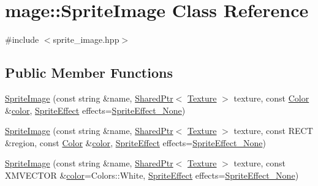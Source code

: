 \hypertarget{classmage_1_1_sprite_image}{}\section{mage\+:\+:Sprite\+Image Class Reference}
\label{classmage_1_1_sprite_image}


{\ttfamily \#include $<$sprite\+\_\+image.\+hpp$>$}

\subsection*{Public Member Functions}
\begin{DoxyCompactItemize}
\item 
\hyperlink{classmage_1_1_sprite_image_a11448d089eb7a52002faa59fe6600182}{Sprite\+Image} (const string \&name, \hyperlink{namespacemage_a1e01ae66713838a7a67d30e44c67703e}{Shared\+Ptr}$<$ \hyperlink{classmage_1_1_texture}{Texture} $>$ texture, const \hyperlink{structmage_1_1_color}{Color} \&\hyperlink{namespacemage_a56eceea5a9bceb2b56073f3ea4945781}{color}, \hyperlink{namespacemage_a9cfe18123066ba4236f548f9de75d881}{Sprite\+Effect} effects=\hyperlink{namespacemage_a9cfe18123066ba4236f548f9de75d881af3c275fbfacfe174da928b2f24dfa515}{Sprite\+Effect\+\_\+\+None})
\item 
\hyperlink{classmage_1_1_sprite_image_a868ee995b3ef1786453e8a695908e871}{Sprite\+Image} (const string \&name, \hyperlink{namespacemage_a1e01ae66713838a7a67d30e44c67703e}{Shared\+Ptr}$<$ \hyperlink{classmage_1_1_texture}{Texture} $>$ texture, const R\+E\+CT \&region, const \hyperlink{structmage_1_1_color}{Color} \&\hyperlink{namespacemage_a56eceea5a9bceb2b56073f3ea4945781}{color}, \hyperlink{namespacemage_a9cfe18123066ba4236f548f9de75d881}{Sprite\+Effect} effects=\hyperlink{namespacemage_a9cfe18123066ba4236f548f9de75d881af3c275fbfacfe174da928b2f24dfa515}{Sprite\+Effect\+\_\+\+None})
\item 
\hyperlink{classmage_1_1_sprite_image_a0b18feb55a4a9c2c8ac5fad2a3fbf1cb}{Sprite\+Image} (const string \&name, \hyperlink{namespacemage_a1e01ae66713838a7a67d30e44c67703e}{Shared\+Ptr}$<$ \hyperlink{classmage_1_1_texture}{Texture} $>$ texture, const X\+M\+V\+E\+C\+T\+OR \&\hyperlink{namespacemage_a56eceea5a9bceb2b56073f3ea4945781}{color}=Colors\+::\+White, \hyperlink{namespacemage_a9cfe18123066ba4236f548f9de75d881}{Sprite\+Effect} effects=\hyperlink{namespacemage_a9cfe18123066ba4236f548f9de75d881af3c275fbfacfe174da928b2f24dfa515}{Sprite\+Effect\+\_\+\+None})

\end{DoxyCompactItemize}
